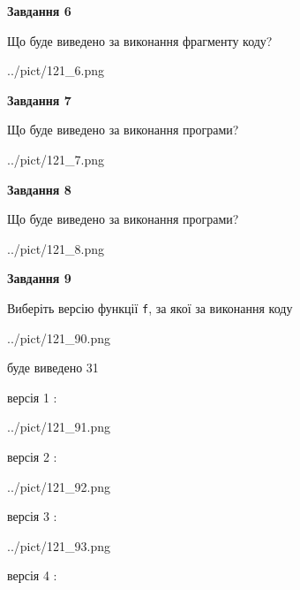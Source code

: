 \documentclass[12pt, ukrainian]{article}
\def\code#1{\Verb!#1!}
\begin{document}
{\begin {large}
{\begin {center}\textbf{Завдання 6}\end {center}}

Що буде виведено за виконання фрагменту коду?\par
\begin{center}
	{../pict/121_6.png}
\end{center}
\newpage

{\begin {center}\textbf{Завдання 7}\end {center}}

Що буде виведено за виконання програми?\par
\begin{center}
	{../pict/121_7.png}
\end{center}
\newpage

{\begin {center}\textbf{Завдання 8}\end {center}}

Що буде виведено за виконання програми?\par
\begin{center}
	{../pict/121_8.png}
\end{center}
\newpage

{\begin {center}\textbf{Завдання 9}\end {center}}

Виберіть версію функції \code{f}, за якої за виконання коду
\begin{center}
	{../pict/121_90.png}
\end{center}
буде виведено 31

\vspace{5mm}
версія 1 :

\begin{center}
	{../pict/121_91.png}
\end{center}
версія 2 :

\begin{center}
	{../pict/121_92.png}
\end{center}
версія 3 :

\begin{center}
	{../pict/121_93.png}
\end{center}
версія 4 :


\end{large}}
\end{document}

